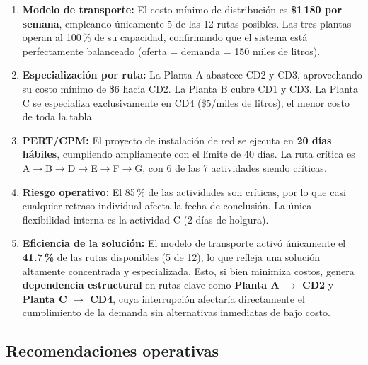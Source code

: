 \documentclass[12pt,a4paper]{article}
\begin{document}
\begin{enumerate}
  \item \textbf{Modelo de transporte:} El costo m\'{i}nimo de distribuci\'{o}n es
  \textbf{\$1\,180 por semana}, empleando \'{u}nicamente 5 de las 12 rutas posibles.
  Las tres plantas operan al 100\,\% de su capacidad, confirmando que el sistema
  est\'{a} perfectamente balanceado (oferta = demanda = 150 miles de litros).

  \item \textbf{Especializaci\'{o}n por ruta:} La Planta A abastece CD2 y CD3,
  aprovechando su costo m\'{i}nimo de \$6 hacia CD2. La Planta B cubre CD1 y CD3.
  La Planta C se especializa exclusivamente en CD4 (\$5/miles de litros),
  el menor costo de toda la tabla.

  \item \textbf{PERT/CPM:} El proyecto de instalaci\'{o}n de red se ejecuta en
  \textbf{20 d\'{i}as h\'{a}biles}, cumpliendo ampliamente con el l\'{i}mite de 40 d\'{i}as.
  La ruta cr\'{i}tica es A$\to$B$\to$D$\to$E$\to$F$\to$G, con 6 de las 
  7 actividades siendo cr\'{i}ticas.

  \item \textbf{Riesgo operativo:} El 85\,\% de las actividades son cr\'{i}ticas,
  por lo que casi cualquier retraso individual afecta la fecha de conclusi\'{o}n.
  La \'{u}nica flexibilidad interna es la actividad C (2 d\'{i}as de holgura).

  \item\noindent\textbf{Eficiencia de la soluci\'{o}n:} El modelo de transporte activ\'{o} 
  \'{u}nicamente el \textbf{41.7\,\%} de las rutas disponibles (5 de 12), lo que refleja 
  una soluci\'{o}n altamente concentrada y especializada. Esto, si bien 
  minimiza costos, genera \textbf{dependencia estructural} en rutas clave como 
  \textbf{Planta A $\to$ CD2} y \textbf{Planta C $\to$ CD4}, cuya interrupci\'{o}n 
  afectar\'{i}a directamente el cumplimiento de la demanda sin alternativas inmediatas 
  de bajo costo.
\end{enumerate}


\subsection{Recomendaciones operativas}
\end{document}
